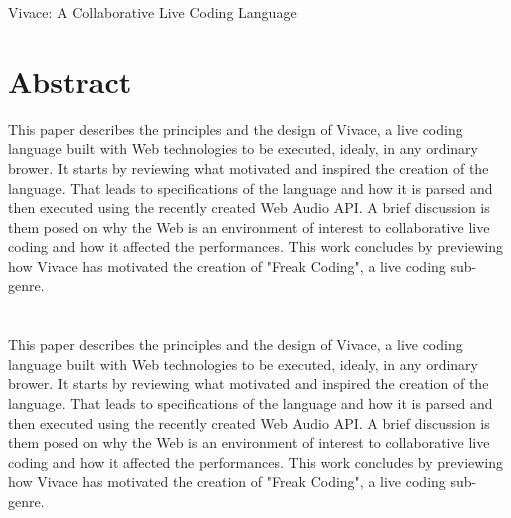 \documentclass[letterpaper, 12pt]{article}
\begin{document}

\vspace*{24pt}


 {\cmjTitle Vivace: A Collaborative Live Coding Language}


\section*{Abstract}
This paper describes the principles and the design of Vivace,     
a live coding language built with Web technologies to be executed, idealy, in any ordinary brower. It starts by reviewing what 
motivated and inspired the creation of the language. That leads
to specifications of the language and how it is parsed and then executed using the recently 
created Web Audio API. A brief discussion is them posed on
why the Web is an  
environment of interest to collaborative live coding and how it
affected the performances. This work concludes by previewing how Vivace has
motivated the creation of "Freak Coding", a live coding sub-genre.

\section*{} %

This paper describes the principles and the design of Vivace,     
a live coding language built with Web technologies to be executed, idealy, in any ordinary brower. It starts by reviewing what 
motivated and inspired the creation of the language. That leads
to specifications of the language and how it is parsed and then executed using the recently 
created Web Audio API. A brief discussion is them posed on
why the Web is an  
environment of interest to collaborative live coding and how it
affected the performances. This work concludes by previewing how Vivace has
motivated the creation of "Freak Coding", a live coding sub-genre.
\end{document}
